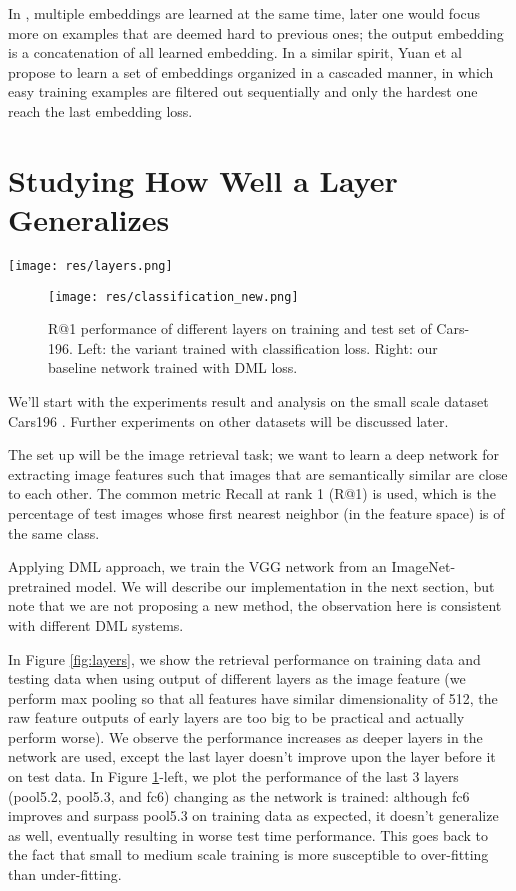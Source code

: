 \documentclass[10pt,twocolumn,letterpaper]{article}
\begin{document}
In \cite{opitz2017bier}, multiple embeddings are learned at the same time, later one would focus more on examples that are deemed hard to previous ones; the output embedding is a concatenation of all learned embedding.
In a similar spirit, Yuan et al \cite{yuan2016hard} propose to learn a set of embeddings organized in a cascaded manner, in which easy training examples are filtered out sequentially and only the hardest one reach the last embedding loss. 

\section{Studying How Well a Layer Generalizes}

\begin{figure*}
  \texttt{[image: res/layers.png]}
  \caption{R@1 performance of different layers on training and test set of Cars-196.}
  \label{fig:layers}
\end{figure*}

\begin{figure}
  \texttt{[image: res/classification\_new.png]}
  \caption{R@1 performance of different layers on training and test set of Cars-196. Left: the variant trained with classification loss. Right: our baseline network trained with DML loss.}
  \label{fig:classification}
\end{figure}


We'll start with the experiments result and analysis on the small scale dataset Cars196 \cite{KrauseStarkDengFei-Fei_3DRR2013}. Further experiments on other datasets will be discussed later.

The set up will be the image retrieval task; we want to learn a deep network for extracting image features such that images that are semantically similar are close to each other.
The common metric Recall at rank 1 (R@1) is used, which is the percentage of test images whose first nearest neighbor (in the feature space) is of the same class.

Applying DML approach, we train the VGG network from an ImageNet-pretrained model. We will describe our implementation in the next section, but note that we are not proposing a new method, the observation here is consistent with different DML systems. 

In Figure \ref{fig:layers}, we show the retrieval performance on training data and testing data when using output of different layers as the image feature (we perform max pooling so that all features have similar dimensionality of 512, the raw feature outputs of early layers are too big to be practical and actually perform worse). We observe the performance increases as deeper layers in the network are used, except the last layer doesn't improve upon the layer before it on test data. In Figure \ref{fig:classification}-left, we plot the performance of the last 3 layers (pool5.2, pool5.3, and fc6) changing as the network is trained: although fc6 improves and surpass pool5.3 on training data as expected, it doesn't generalize as well, eventually resulting in worse test time performance. This goes back to the fact that small to medium scale training is more susceptible to over-fitting than under-fitting.
\end{document}

